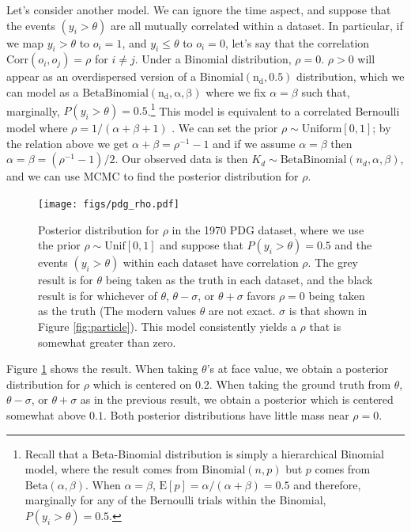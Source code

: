 \documentclass[letterpaper,12pt]{article}
\begin{document}
Let's consider another model. We can ignore the time aspect, and suppose that the events $(y_i>\theta)$ are all mutually correlated within a dataset. In particular, if we map $y_i>\theta$ to $o_i=1$, and $y_i\leq \theta$ to $o_i=0$, let's say that the correlation $\mathrm{Corr}(o_i,o_j)=\rho$ for $i\neq j$. Under a Binomial distribution, $\rho=0$. $\rho>0$ will appear as an overdispersed version of a $\mathrm{Binomial(n_d,0.5)}$ distribution, which we can model as a $\mathrm{BetaBinomial(n_d,\alpha,\beta)}$ where we fix $\alpha=\beta$ such that, marginally, $P(y_i>\theta)=0.5$.\footnote{Recall that a Beta-Binomial distribution is simply a hierarchical Binomial model, where the result comes from $\mathrm{Binomial}(n,p)$ but $p$ comes from $\mathrm{Beta}(\alpha,\beta)$. When $\alpha=\beta$, $\mathrm{E}[p]=\alpha/(\alpha+\beta)=0.5$ and therefore, marginally for any of the Bernoulli trials within the Binomial, $P(y_i>\theta)=0.5$.} This model is equivalent to a correlated Bernoulli model where $\rho=1/(\alpha+\beta+1)$ \cite[eq.~6]{hisakado2006correlated}. We can set the prior $\rho\sim\mathrm{Uniform}[0,1]$; by the relation above we get $\alpha+\beta=\rho^{-1}-1$ and if we assume $\alpha=\beta$ then $\alpha=\beta=(\rho^{-1}-1)/2$. Our observed data is then $K_d\sim\mathrm{BetaBinomial}(n_d,\alpha,\beta)$, and we can use MCMC to find the posterior distribution for $\rho$.

\begin{figure}[htbp]
  \centering
  \texttt{[image: figs/pdg\_rho.pdf]}
  \caption{Posterior distribution for $\rho$ in the 1970 PDG dataset, where we use the prior $\rho\sim\mathrm{Unif}[0,1]$ and suppose that $P(y_i>\theta)=0.5$ and the events $(y_i>\theta)$ within each dataset have correlation $\rho$. The grey result is for $\theta$ being taken as the truth in each dataset, and the black result is for whichever of $\theta$, $\theta-\sigma$, or $\theta+\sigma$ favors $\rho=0$ being taken as the truth (The modern values $\theta$ are not exact. $\sigma$ is that shown in Figure \ref{fig:particle}). This model consistently yields a $\rho$ that is somewhat greater than zero.}
  \label{fig:pdg-rho}
\end{figure}

Figure \ref{fig:pdg-rho} shows the result. When taking $\theta$'s at face value, we obtain a posterior distribution for $\rho$ which is centered on 0.2. When taking the ground truth from $\theta$, $\theta-\sigma$, or $\theta+\sigma$ as in the previous result, we obtain a posterior which is centered somewhat above $0.1$. Both posterior distributions have little mass near $\rho=0$.
\end{document}
